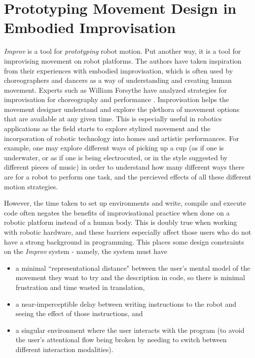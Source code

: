 \documentclass[sigconf]{acmart}
\begin{document}
\section{Prototyping Movement Design in Embodied Improvisation}\label{embodied}

\emph{Improv} is a tool for \emph{prototyping} robot motion. Put another way, it
is a tool for improvising movement on robot platforms. The authors have taken
inspiration from their experiences with embodied improvisation, which is often
used by choreographers and dancers as a way of understanding and creating human
movement. Experts such as William Forsythe have analyzed strategies for
improvisation for choreography and performance \cite{forsythe2004improvisation}.
Improvisation helps the movement designer understand and explore the plethora of
movement options that are available at any given time. This is especially useful
in robotics applications as the field starts to explore stylized movement and
the incorporation of robotic technology into homes and artistic performances. For
example, one may explore different ways of picking up a cup (as if one is
underwater, or as if one is being electrocuted, or in the style suggested by
different pieces of music) in order to understand how many different ways there
are for a robot to perform one task, and the percieved effects of all these
different motion strategies.

However, the time taken to set up environments and write, compile and
execute code often negates the benefits of improvisational practice when done
on a robotic platform instead of a human body. This is
doubly true when working with robotic hardware, and these barriers especially
affect those users who do not have a strong background in programming. This places
some design constraints on the \emph{Improv} system - namely, the system must
have

\begin{itemize}
\item a minimal ``representational
distance" between the user's mental model of the movement they want to try and
the description in code, so there is minimal frustration and time wasted in
translation,
\item a near-imperceptible delay between writing instructions to the robot and
seeing the effect of those instructions, and
\item a singular environment where the
user interacts with the program (to avoid the user's attentional flow being
broken by needing to switch between different interaction modalities).
\end{itemize}
\end{document}
